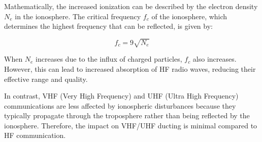 Mathematically, the increased ionization can be described by the electron density \( N_e \) in the ionosphere. The critical frequency \( f_c \) of the ionosphere, which determines the highest frequency that can be reflected, is given by:

\[
f_c = 9 \sqrt{N_e}
\]

When \( N_e \) increases due to the influx of charged particles, \( f_c \) also increases. However, this can lead to increased absorption of HF radio waves, reducing their effective range and quality.

In contrast, VHF (Very High Frequency) and UHF (Ultra High Frequency) communications are less affected by ionospheric disturbances because they typically propagate through the troposphere rather than being reflected by the ionosphere. Therefore, the impact on VHF/UHF ducting is minimal compared to HF communication.

